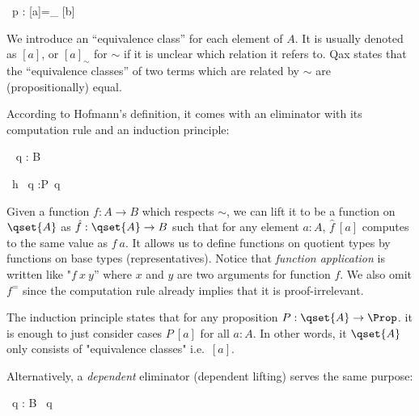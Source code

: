 \begin{multicols}{2}
\columnbreak
{}
{ \Gamma \vdash {} ~p : [a]=_{} [b]}
\end{multicols}


We introduce an ``equivalence class'' for each element of $A$. It is usually denoted as $[ a ]$, or $[ a ]_{\sim}$ for $\sim$ if it is unclear which relation it refers to. 
 Qax states that the ``equivalence classes'' of two terms which are related by $\sim$ are (propositionally) equal.


According to Hofmann's \cite{hof:95:sm} definition, it comes with an eliminator with its computation rule and an induction principle:


{\Gamma \vdash  {} ~ q : B}



{\Gamma \vdash {} ~h ~q :P~q}

Given a function $f : A \to B$ which respects $\sim$, we can lift it to be a function on $\qset{A}$ as $\hat{f} : \qset{A} \to B$ such that for any element $a : A$, $\hat{f} ~[ a ]$ computes to the same value as $f ~ a$. It allows us to define functions on quotient types by functions on base types (representatives).
Notice that \emph{function application} is written like "$f ~x ~ y$'' where $x$ and $y$ are two arguments for function $f$. We also omit $f^=$ since the computation rule already implies that it is proof-irrelevant.

The induction principle states that for any proposition $P : \qset{A} \to \Prop$. it is enough to just consider cases $ P ~ [ a ]$ for all $a : A$. In other words, it $\qset{A}$ only consists of "equivalence classes" i.e.\ $[ a ]$.


Alternatively, a \emph{dependent} eliminator (dependent lifting) serves the same purpose:

{\Gamma \vdash {} ~q : B~ q}

